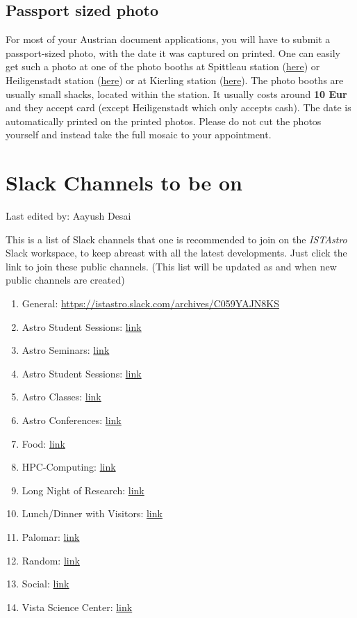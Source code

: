\documentclass{article}
\newcommand{\setlasteditor}[1]{\gdef\lasteditor{#1}}
\newcommand{\lastedited}{%
    \vspace{1mm} {\footnotesize Last edited by: \lasteditor} \vspace{3mm}
    \newline

}
\begin{document}
\subsection{Passport sized photo}
\noindent
For most of your Austrian document applications, you will have to submit a passport-sized photo, with the date it was captured on printed. One can easily get such a photo at one of the photo booths at Spittleau station (\href{https://maps.app.goo.gl/CRdGfkwThCaowHny5}{here}) or Heiligenstadt station (\href{https://maps.app.goo.gl/hUrvxbjUpanRm38Y7}{here}) or at Kierling station (\href{https://maps.app.goo.gl/9DMVMN9KAu2Senhv6}{here}). The photo booths are usually small shacks, located within the station. It usually costs around \textbf{10 Eur} and they accept card (except Heiligenstadt which only accepts cash). The date is automatically printed on the printed photos. Please do not cut the photos yourself and instead take the full mosaic to your appointment. 
\section{Slack Channels to be on}
\setlasteditor{Aayush Desai}
\lastedited
\noindent
This is a list of Slack channels that one is recommended to join on the \textit{ISTAstro} Slack workspace, to keep abreast with all the latest developments. Just click the link to join these public channels. (This list will be updated as and when new public channels are created)
\begin{enumerate}
    \item General: \href{}{https://istastro.slack.com/archives/C059YAJN8KS}
    \item Astro Student Sessions: \href{https://istastro.slack.com/archives/C062NF7FAB1}{link}
    \item Astro Seminars: \href{https://istastro.slack.com/archives/C06JJNEFFPY}{link}
    \item Astro Student Sessions: \href{https://istastro.slack.com/archives/C062NF7FAB1}{link}
    \item Astro Classes: \href{https://istastro.slack.com/archives/C08T3N94363}{link}
    \item Astro Conferences: \href{https://istastro.slack.com/archives/C06628E3ELR}{link}
    \item Food: \href{https://istastro.slack.com/archives/C05V5H49W3A}{link}
    \item HPC-Computing: \href{https://istastro.slack.com/archives/C07RQ876FC6}{link}
    \item Long Night of Research: \href{https://istastro.slack.com/archives/C06UYT9NZ4P}{link}
    \item Lunch/Dinner with Visitors: \href{https://istastro.slack.com/archives/C06ECTPKPK7}{link}
    \item Palomar: \href{https://istastro.slack.com/archives/C09G29VSU7L}{link}
    \item Random: \href{https://istastro.slack.com/archives/C05QQ8KRG7R}{link}
    \item Social: \href{https://istastro.slack.com/archives/C05R4QFL66N}{link}
    \item Vista Science Center: \href{https://istastro.slack.com/archives/C089Z3R6UF4}{link}
\end{enumerate}
\end{document}
